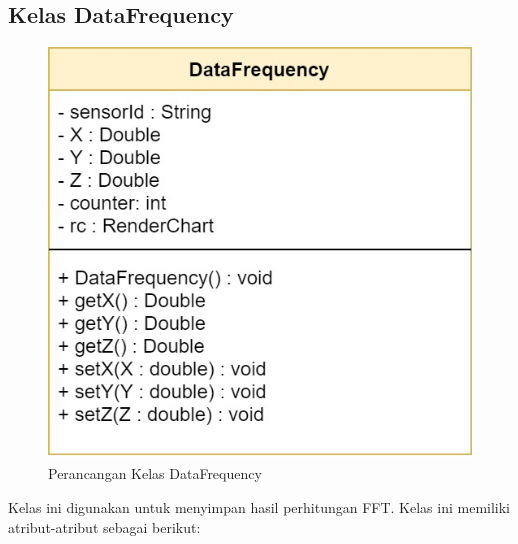 \subsection{Kelas DataFrequency}
\begin{figure}[H] 
	\centering  
	\includegraphics[scale=0.35]{Gambar/Controller Package/Controller-DataFrequency.jpg}
	\caption[Perancangan Kelas DataFrequency]{Perancangan Kelas DataFrequency}
	\label{fig:controller_datafrequency} 
\end{figure}

Kelas ini digunakan untuk menyimpan hasil perhitungan FFT. Kelas ini memiliki atribut-atribut sebagai berikut:

